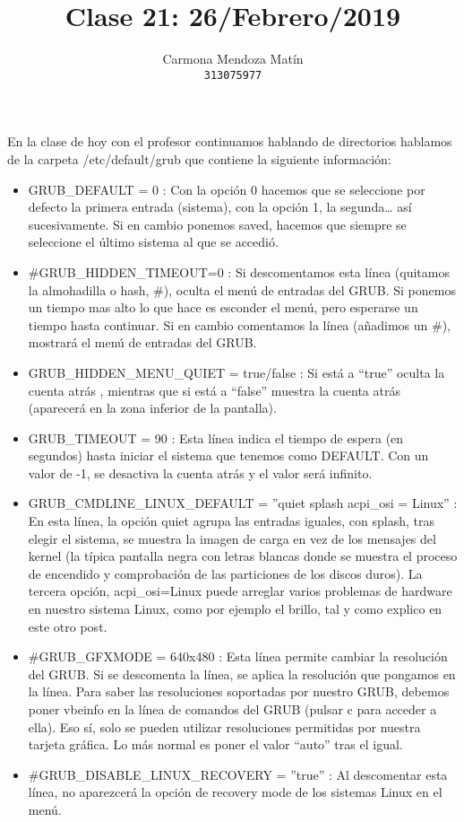 \documentclass[11pt, a4paper]{report}
\begin{document}
\title{Clase 21: 26/Febrero/2019}
\author{
  Carmona Mendoza Mat\'in\\
  \texttt{313075977}
}
\date{}
\maketitle

En la clase de hoy con el profesor continuamos hablando de directorios hablamos
de la carpeta /etc/default/grub que contiene la siguiente información:

\begin{itemize}
\item GRUB\_DEFAULT = 0 : Con la opción 0 hacemos que se seleccione por defecto
  la primera entrada (sistema), con la opción 1, la segunda… así sucesivamente.
  Si en cambio ponemos saved, hacemos que siempre se seleccione el último
  sistema al que se accedió.
\item \#GRUB\_HIDDEN\_TIMEOUT=0 : Si descomentamos esta línea (quitamos la
  almohadilla o hash, \#), oculta el menú de entradas del GRUB. Si ponemos un
  tiempo mas alto lo que hace es esconder el menú, pero esperarse un tiempo
  hasta continuar. Si en cambio comentamos la línea (añadimos un \#), mostrará
  el menú de entradas del GRUB.
\item GRUB\_HIDDEN\_MENU\_QUIET = true/false : Si está a “true” oculta la
  cuenta atrás , mientras que si está a “false” muestra la cuenta atrás
  (aparecerá en la zona inferior de la pantalla).
\item GRUB\_TIMEOUT = 90 : Esta línea indica el tiempo de espera (en segundos)
  hasta iniciar el sistema que tenemos como DEFAULT. Con un valor de -1, se
  desactiva la cuenta atrás y el valor será infinito.
\item GRUB\_CMDLINE\_LINUX\_DEFAULT = ”quiet splash acpi\_osi = Linux” : En esta
  línea, la opción quiet agrupa las entradas iguales, con splash, tras elegir
  el sistema, se muestra la imagen de carga en vez de los mensajes del kernel
  (la típica pantalla negra con letras blancas donde se muestra el proceso de
  encendido y comprobación de las particiones de los discos duros). La tercera
  opción, acpi\_osi=Linux puede arreglar varios problemas de hardware en nuestro
  sistema Linux, como por ejemplo el brillo, tal y como explico en este otro
  post.
\item \#GRUB\_GFXMODE = 640x480 : Esta línea permite cambiar la resolución del
  GRUB. Si se descomenta la línea, se aplica la resolución que pongamos en la
  línea. Para saber las resoluciones soportadas por nuestro GRUB, debemos poner
  vbeinfo en la línea de comandos del GRUB (pulsar c para acceder a ella). Eso
  sí, solo se pueden utilizar resoluciones permitidas por nuestra tarjeta
  gráfica. Lo más normal es poner el valor “auto” tras el igual.
\item \#GRUB\_DISABLE\_LINUX\_RECOVERY = ”true” : Al descomentar esta línea, no
  aparezcerá la opción de recovery mode de los sistemas Linux en el menú.
\end{itemize}
\end{document}

